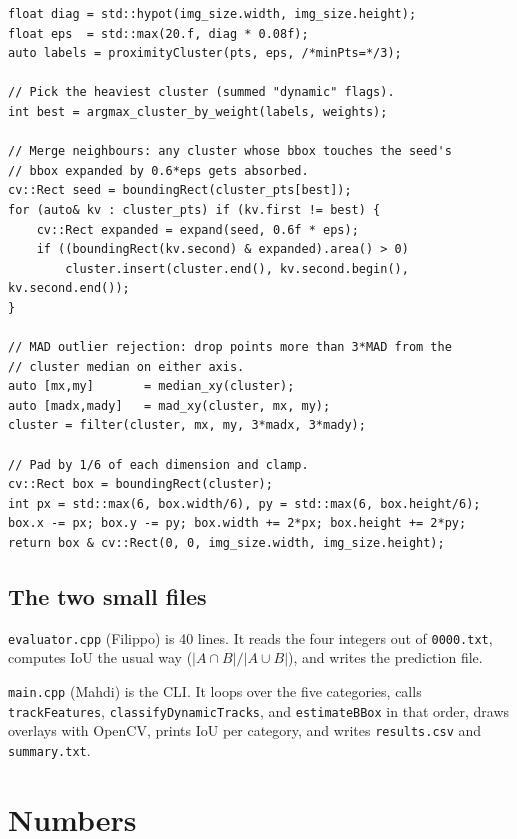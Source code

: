 \documentclass[11pt,a4paper]{article}
\begin{document}
\begin{lstlisting}[caption={Sketch of \texttt{estimateBBox}. Real code has more guard clauses.}]
float diag = std::hypot(img_size.width, img_size.height);
float eps  = std::max(20.f, diag * 0.08f);
auto labels = proximityCluster(pts, eps, /*minPts=*/3);

// Pick the heaviest cluster (summed "dynamic" flags).
int best = argmax_cluster_by_weight(labels, weights);

// Merge neighbours: any cluster whose bbox touches the seed's
// bbox expanded by 0.6*eps gets absorbed.
cv::Rect seed = boundingRect(cluster_pts[best]);
for (auto& kv : cluster_pts) if (kv.first != best) {
    cv::Rect expanded = expand(seed, 0.6f * eps);
    if ((boundingRect(kv.second) & expanded).area() > 0)
        cluster.insert(cluster.end(), kv.second.begin(), kv.second.end());
}

// MAD outlier rejection: drop points more than 3*MAD from the
// cluster median on either axis.
auto [mx,my]       = median_xy(cluster);
auto [madx,mady]   = mad_xy(cluster, mx, my);
cluster = filter(cluster, mx, my, 3*madx, 3*mady);

// Pad by 1/6 of each dimension and clamp.
cv::Rect box = boundingRect(cluster);
int px = std::max(6, box.width/6), py = std::max(6, box.height/6);
box.x -= px; box.y -= py; box.width += 2*px; box.height += 2*py;
return box & cv::Rect(0, 0, img_size.width, img_size.height);
\end{lstlisting}

\subsection{The two small files}

\texttt{evaluator.cpp} (Filippo) is 40 lines. It reads the four
integers out of \texttt{0000.txt}, computes IoU the usual way
($|A \cap B|/|A \cup B|$), and writes the prediction file.

\texttt{main.cpp} (Mahdi) is the CLI. It loops over the five
categories, calls \texttt{trackFeatures}, \texttt{classifyDynamicTracks},
and \texttt{estimateBBox} in that order, draws overlays with
OpenCV, prints IoU per category, and writes \texttt{results.csv}
and \texttt{summary.txt}.

\section{Numbers}
\end{document}
